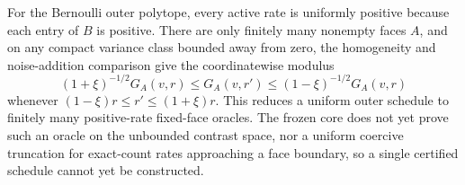 For the Bernoulli outer polytope, every active rate is uniformly positive because each entry of \(B\) is positive.  There are only finitely many nonempty faces \(A\), and on any compact variance class bounded away from zero, the homogeneity and noise-addition comparison give the coordinatewise modulus
\[
 (1+\xi)^{-1/2}G_A(v,r)\leq G_A(v,r')\leq(1-\xi)^{-1/2}G_A(v,r)
\]
whenever \((1-\xi)r\leq r'\leq(1+\xi)r\).  This reduces a uniform outer schedule to finitely many positive-rate fixed-face oracles.  The frozen core does not yet prove such an oracle on the unbounded contrast space, nor a uniform coercive truncation for exact-count rates approaching a face boundary, so a single certified schedule cannot yet be constructed.